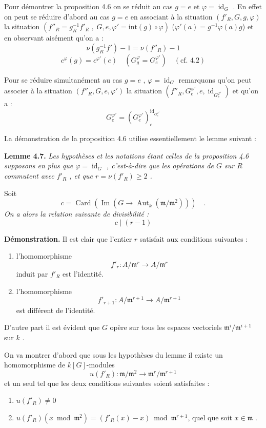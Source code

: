 \documentclass[11pt]{article}
\providecommand{\fm}{\mathfrak{m}}
\providecommand{\id}{\operatorname{id}}
\providecommand{\id}{\operatorname{id}}
\providecommand{\id}{\operatorname{id}}
\providecommand{\Aut}{\operatorname{Aut}}
\providecommand{\id}{\operatorname{id}}
\providecommand{\id}{\operatorname{id}}
\providecommand{\im}{\operatorname{Im}}
\providecommand{\fm}{\mathfrak m}
\providecommand{\im}{\operatorname{im}}
\providecommand{\Aut}{\operatorname{Aut}}
\providecommand{\id}{\operatorname{id}}
\begin{document}
\medskip

Pour démontrer la proposition 4.6 on se réduit au cas $g = e$ et $\varphi = \id_G$ . En effet on peut se réduire d'abord au cas $g = e$ en associant à la situation $(f'_R, G, g, \varphi)$ la situation $(f''_R = g_R^{-1}f'_R \; , \; G, e, \varphi' = \mathrm{int}(g) \circ \varphi)$ ($\varphi'(a) = g^{-1}\varphi(a)g$) et en observant aisément qu'on a :
\[
\nu(g_R^{-1}f') - 1 = \nu(f''_R) - 1
\]
\[
c^\varphi(g) = c^{\varphi'}(e) \quad (G_g^\varphi = G_e^{\varphi'}) \quad (\text{cf. 4.2})
\]

Pour se réduire simultanément au cas $g = e$ , $\varphi = \id_G$ remarquons qu'on peut associer à la situation $(f''_R, G, e, \varphi')$ la situation $(f''_R, G_e^{\varphi'}, e, \id_{G_e^{\varphi'}})$ et qu'on a :
\[
G_e^{\varphi'} = (G_e^{\varphi'})_e^{\id_{G_e^{\varphi'}}}
\]

La démonstration de la proposition 4.6 utilise essentiellement le lemme suivant :

\medskip
\noindent
\textbf{Lemme 4.7.} \emph{Les hypothèses et les notations étant celles de la proposition 4.6 supposons en plus que $\varphi = \id_G$ , c'est-à-dire que les opérations de $G$ sur $R$ commutent avec $f'_R$ , et que $r = \nu(f'_R) \geq 2$ .}

Soit
\emph{\[
c = \operatorname{Card}(\im(G \longrightarrow \Aut_k(\fm/\fm^2))) \quad .
\]
On a alors la relation suivante de divisibilité :
\[
c \mid (r - 1)
\]}

\medskip

\noindent
\textbf{Démonstration.} Il est clair que l'entier $r$ satisfait aux conditions suivantes :
\begin{enumerate}
\item[a)] l'homomorphisme
\[
f'_r : A/\fm^r \longrightarrow A/\fm^r
\]
induit par $f'_R$ est l'identité.
\item[b)] l'homomorphisme
\[
f'_{r+1} : A/\fm^{r+1} \longrightarrow A/\fm^{r+1}
\]
est différent de l'identité.
\end{enumerate}

D'autre part il est évident que $G$ opère sur tous les espaces vectoriels $\fm^i/\fm^{i+1}$ sur $k$ .

On va montrer d'abord que sous les hypothèses du lemme il existe un homomorphisme de $k[G]$-modules
\[
u(f'_R) : \fm/\fm^2 \longrightarrow \fm^r/\fm^{r+1}
\]
et un seul tel que les deux conditions suivantes soient satisfaites :
\begin{enumerate}
\item[1)] $u(f'_R) \neq 0$
\item[2)] $u(f'_R)(x \bmod \fm^2) = (f'_R(x) - x) \bmod \fm^{r+1}$, quel que soit $x \in \fm$ .
\end{enumerate}
\end{document}

